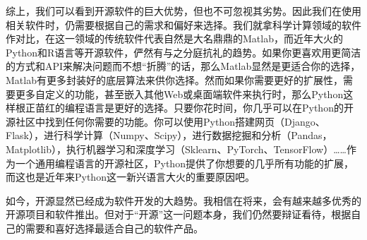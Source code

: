 \documentclass[UTF8]{ctexart}
\begin{document}
综上，我们可以看到开源软件的巨大优势，但也不可忽视其劣势。因此我们在使用相关软件时，仍需要根据自己的需求和偏好来选择。我们就拿科学计算领域的软件作对比，在这一领域的传统软件代表自然是大名鼎鼎的Matlab，而近年大火的Python和R语言等开源软件，俨然有与之分庭抗礼的趋势。如果你更喜欢用更简洁的方式和API来解决问题而不想“折腾”的话，那么Matlab显然是更适合你的选择，Matlab有更多封装好的底层算法来供你选择。然而如果你需要更好的扩展性，需要更多自定义的功能，甚至嵌入其他Web或桌面端软件来执行时，那么Python这样根正苗红的编程语言是更好的选择。只要你花时间，你几乎可以在Python的开源社区中找到任何你需要的功能。你可以使用Python搭建网页（Django、Flask），进行科学计算（Numpy、Scipy），进行数据挖掘和分析（Pandas，Matplotlib），执行机器学习和深度学习（Sklearn、PyTorch、TensorFlow）……作为一个通用编程语言的开源社区，Python提供了你想要的几乎所有功能的扩展，而这也是近年来Python这一新兴语言大火的重要原因吧。

如今，开源显然已经成为软件开发的大趋势。我相信在将来，会有越来越多优秀的开源项目和软件推出。但对于“开源”这一问题本身，我们仍然要辩证看待，根据自己的需要和喜好选择最适合自己的软件产品。


\end{document}
